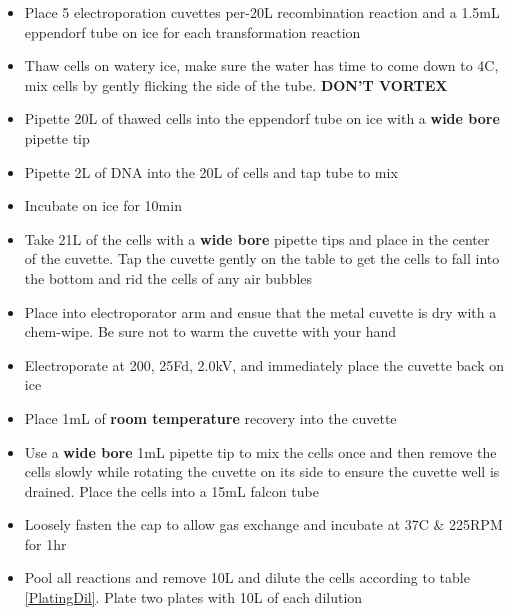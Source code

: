 \documentclass[a4paper]{article}
\begin{document}
       	\begin{itemize}
        
        	\item Place 5 electroporation cuvettes per-20\textmu L recombination reaction and a 1.5mL eppendorf tube on ice for each transformation reaction
            
            \item Thaw cells on watery ice, make sure the water has time to come down to 4C, mix cells by gently flicking the side of the tube. \textbf{DON’T VORTEX}
            
            \item Pipette 20\textmu L of thawed cells into the eppendorf tube on ice with a \textbf{wide bore} pipette tip
        	
            \item Pipette 2\textmu L of DNA into the 20\textmu L of cells and tap tube to mix
            
            \item Incubate on ice for 10min
            
            \item Take 21\textmu L of the cells with a \textbf{wide bore} pipette tips and place in the center of the cuvette. Tap the cuvette gently on the table to get the cells to fall into the bottom and rid the cells of any air bubbles 
 
            \item Place into electroporator arm and ensue that the metal cuvette is dry with a chem-wipe. Be sure not to warm the cuvette with your hand

            \item Electroporate at 200\textohm , 25\textmu Fd, 2.0kV, and immediately place the cuvette back on ice

            \item Place 1mL of \textbf{room temperature} recovery into the cuvette

            \item Use a \textbf{wide bore} 1mL pipette tip to mix the cells once and then remove the cells slowly while rotating the cuvette on its side to ensure the cuvette well is drained. Place the cells into a 15mL falcon tube

            \item Loosely fasten the cap to allow gas exchange and incubate at 37C \& 225RPM for 1hr

			\item Pool all reactions and remove 10\textmu L and dilute the cells according to table \ref{PlatingDil}. Plate two plates with 10\textmu L of each dilution
            

\end{itemize}
\end{document}
